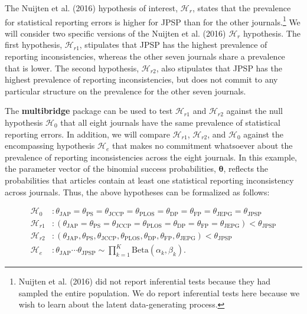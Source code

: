 \documentclass[
  english,
  man,floatsintext]{apa6}
\begin{document}
The Nuijten et al. (2016) hypothesis of interest, \(\mathcal{H}_r\), states that the prevalence for statistical reporting errors is higher for JPSP than for the other journals.\footnote{Nuijten et al. (2016) did not report inferential tests because they had sampled the entire population. We do report inferential tests here because we wish to learn about the latent data-generating process.} We will consider two specific versions of the Nuijten et al. (2016) \(\mathcal{H}_r\) hypothesis. The first hypothesis, \(\mathcal{H}_{r1}\), stipulates that JPSP has the highest prevalence of reporting inconsistencies, whereas the other seven journals share a prevalence that is lower. The second hypothesis, \(\mathcal{H}_{r2}\), also stipulates that JPSP has the highest prevalence of reporting inconsistencies, but does not commit to any particular structure on the prevalence for the other seven journals.

The \textbf{multibridge} package can be used to test \(\mathcal{H}_{r1}\) and \(\mathcal{H}_{r2}\) against the null hypothesis \(\mathcal{H}_0\) that all eight journals have the same prevalence of statistical reporting errors. In addition, we will compare \(\mathcal{H}_{r1}\), \(\mathcal{H}_{r2}\), and \(\mathcal{H}_0\) against the encompassing hypothesis \(\mathcal{H}_e\) that makes no commitment whatsoever about the prevalence of reporting inconsistencies across the eight journals. In this example, the parameter vector of the binomial success probabilities, \(\boldsymbol{\theta}\), reflects the probabilities that articles contain at least one statistical reporting inconsistency across journals. Thus, the above hypotheses can be formalized as follows:

\begin{align*}
    \mathcal{H}_0 &:  \theta_{\text{JAP}} = \theta_{\text{PS}} = \theta_{\text{JCCP}} = \theta_{\text{PLOS}} = \theta_{\text{DP}} = \theta_{\text{FP}}= \theta_{\text{JEPG}} = \theta_{\text{JPSP}}\\
    \mathcal{H}_{r1} &:  (\theta_{\text{JAP}} = \theta_{\text{PS}} = \theta_{\text{JCCP}} = \theta_{\text{PLOS}} = \theta_{\text{DP}} = \theta_{\text{FP}}= \theta_{\text{JEPG}}) < \theta_{\text{JPSP}} \\
    \mathcal{H}_{r2} &: (\theta_{\text{JAP}} , \theta_{\text{PS}} , \theta_{\text{JCCP}} , \theta_{\text{PLOS}} , \theta_{\text{DP}} , \theta_{\text{FP}} , \theta_{\text{JEPG}}) < \theta_{\text{JPSP}} \\
    \mathcal{H}_e &:  \theta_{\text{JAP}} \cdots \theta_{\text{JPSP}} \sim \prod_{k = 1}^K \text{Beta}(\alpha_k, \beta_k).
\end{align*}
\end{document}
